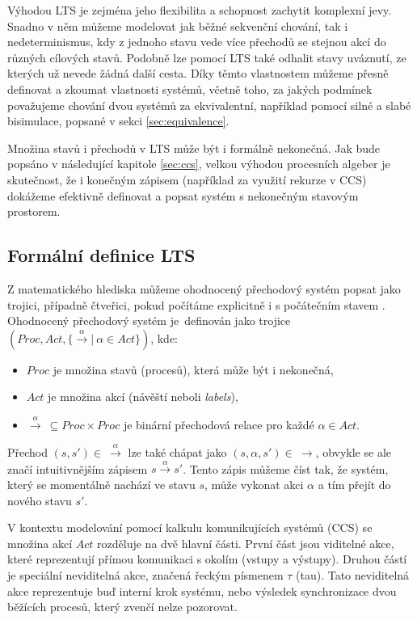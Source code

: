 Výhodou LTS je zejména jeho flexibilita a schopnost zachytit komplexní jevy.
Snadno v něm můžeme modelovat jak běžné sekvenční chování, tak i nedeterminismus, kdy z jednoho stavu vede více přechodů se stejnou akcí do různých cílových stavů.
Podobně lze pomocí LTS také odhalit stavy uváznutí, ze kterých už nevede žádná další cesta. 
Díky těmto vlastnostem můžeme přesně definovat a zkoumat vlastnosti systémů, včetně toho, 
za jakých podmínek považujeme chování dvou systémů za ekvivalentní, například pomocí silné a slabé bisimulace, popsané v sekci \ref{sec:equivalence}.

Množina stavů i přechodů v LTS může být i formálně nekonečná. 
Jak bude popsáno v následující kapitole \ref{sec:ccs}, velkou výhodou procesních algeber je skutečnost, 
že i konečným zápisem (například za využití rekurze v CCS) dokážeme efektivně definovat a popsat systém s nekonečným stavovým prostorem.

\subsection{Formální definice LTS}
Z matematického hlediska můžeme ohodnocený přechodový systém popsat jako trojici, případně čtveřici, pokud počítáme explicitně i s počátečním stavem \cite{presentation1}.
Ohodnocený přechodový systém je~definován jako trojice $(Proc, Act, \{\xrightarrow{\alpha} |\ \alpha \in Act\})$, kde:
\begin{itemize}
    \item $Proc$ je množina stavů (procesů), která může být i nekonečná,
    \item $Act$ je množina akcí (návěští neboli \textit{labels}),
    \item $\xrightarrow{\alpha}\ \subseteq Proc \times Proc$ je binární přechodová relace pro každé $\alpha \in Act$.
\end{itemize}

Přechod $(s, s') \in\ \xrightarrow{\alpha}$ lze také chápat jako $(s, \alpha, s') \in\ \rightarrow$, obvykle se ale značí intuitivnějším zápisem $s \xrightarrow{\alpha} s'$. 
Tento zápis můžeme číst tak, že systém, který se momentálně nachází ve stavu $s$, může vykonat akci $\alpha$ a tím přejít do nového stavu $s'$. 

V kontextu modelování pomocí kalkulu komunikujících systémů (CCS) se množina akcí $Act$ rozděluje na dvě hlavní části.
První část jsou viditelné akce, které reprezentují přímou komunikaci s okolím (vstupy a výstupy).
Druhou částí je speciální neviditelná akce, značená řeckým písmenem $\tau$ (tau). 
Tato neviditelná akce reprezentuje buď interní krok systému, nebo výsledek synchronizace dvou běžících procesů, který zvenčí nelze pozorovat. 

